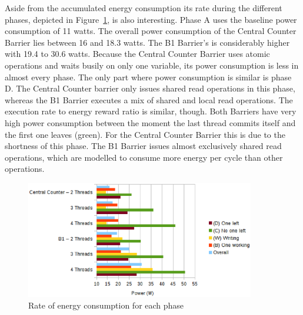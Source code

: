 \documentclass[a4paper, 10pt]{article}
\begin{document}
Aside from the accumulated energy consumption its rate during the different phases, depicted in Figure~\ref{fig:c1-power-work-100}, is also interesting.
Phase A uses the baseline power consumption of 11 watts.
The overall power consumption of the Central Counter Barrier lies between 16 and 18.3 watts. The B1 Barrier's is considerably higher with 19.4 to 30.6 watts.
Because the Central Counter Barrier uses atomic operations and waits busily on only one variable, its power consumption is less in almost every phase.
The only part where power consumption is similar is phase D. The Central Counter barrier only issues shared read operations in this phase, whereas the B1 Barrier executes a mix of shared and local read operations. The execution rate to energy reward ratio is similar, though.
Both Barriers have very high power consumption between the moment the last thread commits itself and the first one leaves (green). For the Central Counter Barrier this is due to the shortness of this phase. The B1 Barrier issues almost exclusively shared read operations, which are modelled to consume more energy per cycle than other operations.
\begin{figure}[htbp]
	\centering
	\includegraphics[width=10cm]{charts/c1-power-work-100}
	\caption{Rate of energy consumption for each phase}
	\label{fig:c1-power-work-100}
\end{figure}
\end{document}
